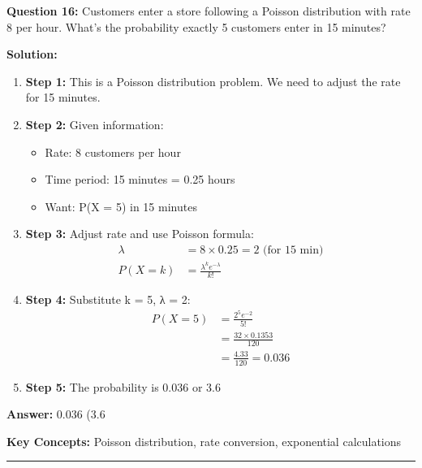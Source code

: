 \textbf{Question 16:} Customers enter a store following a Poisson distribution with rate 8 per hour. What's the probability exactly 5 customers enter in 15 minutes?

\textbf{Solution:}
\begin{enumerate}
\item \textbf{Step 1:} This is a Poisson distribution problem. We need to adjust the rate for 15 minutes.

\item \textbf{Step 2:} Given information:
\begin{itemize}
\item Rate: 8 customers per hour
\item Time period: 15 minutes = 0.25 hours  
\item Want: P(X = 5) in 15 minutes
\end{itemize}

\item \textbf{Step 3:} Adjust rate and use Poisson formula:
\begin{align}
\lambda &= 8 \times 0.25 = 2 \text{ (for 15 min)} \\
P(X = k) &= \frac{\lambda^k e^{-\lambda}}{k!}
\end{align}

\item \textbf{Step 4:} Substitute k = 5, λ = 2:
\begin{align}
P(X = 5) &= \frac{2^5 e^{-2}}{5!} \\
&= \frac{32 \times 0.1353}{120} \\
&= \frac{4.33}{120} = 0.036
\end{align}

\item \textbf{Step 5:} The probability is 0.036 or 3.6%
\end{enumerate}

\textbf{Answer:} 0.036 (3.6%

\textbf{Key Concepts:} Poisson distribution, rate conversion, exponential calculations

\hrule
\vspace{1em}
